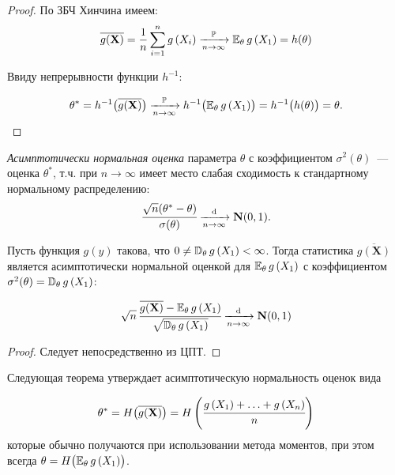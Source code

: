 \begin{proof}
    По ЗБЧ Хинчина имеем:
    \begin{equation*}
        \overline{g(\mathbf{X})} = 
        \frac{1}{n} \sum\limits_{i=1}^{n} g\left(X_{i}\right) 
        \xrightarrow[n \to \infty]{\mathbb{P}} \mathbb{E}_{\theta}\, g\left(X_{1}\right) = 
        h(\theta)
    \end{equation*}

    Ввиду непрерывности функции $h^{-1}$:

    \begin{equation*}
        \theta^{*} = h^{-1}\bigl(\overline{g(\mathbf{X})}\bigr) 
        \xrightarrow[n \to \infty]{\mathbb{P}} h^{-1}\bigl(\mathbb{E}_{\theta}\, g\left(X_{1}\right)\bigr) = 
        h^{-1}\bigl(h(\theta)\bigr) = \theta.
    \end{equation*}
\end{proof}

\begin{defn}
    \textit{Асимптотически нормальная оценка} параметра $\theta$ с коэффициентом $\sigma^{2}(\theta)$~--- оценка $\theta^{*}$, т.ч. при $n \rightarrow \infty$ имеет место слабая сходимость к стандартному нормальному распределению: 
    \begin{equation*}
        \cfrac{\sqrt{n}(\theta^{*}-\theta)}{\sigma(\theta)} \xrightarrow[n \to \infty]{\text{d}} \mathbf{N}(0, 1).
    \end{equation*}
\end{defn}

\begin{lem}
    Пусть функция $g(y)$ такова, что $0 \neq \mathbb{D}_{\theta}\, g\left(X_{1}\right)<\infty$. 
    Тогда статистика $\overline{g(\mathbf{X})}$ является асимптотически нормальной оценкой для $\mathbb{E}_{\theta}\, g\left(X_{1}\right)$ с коэффициентом $\sigma^{2}(\theta)=\mathbb{D}_{\theta}\, g\left(X_{1}\right)$:

    \begin{equation*}
        \sqrt{n} \, \cfrac{\overline{g(\mathbf{X})}-\mathbb{E}_{\theta}\, g\left(X_{1}\right)}{\sqrt{\mathbb{D}_{\theta}\, g\left(X_{1}\right)}} 
        \xrightarrow[n \to \infty]{\text{d}} \mathbf{N}(0, 1)
    \end{equation*}
\end{lem}

\begin{proof}
    Следует непосредственно из ЦПТ.
\end{proof}

\begin{rmrk}
    Следующая теорема утверждает асимптотическую нормальность оценок вида

    \begin{equation*}
        \theta^{*} = 
        H \bigl( \overline{g(\mathbf{X})} \bigr) = 
        H\left(\cfrac{g\left(X_{1}\right)+\ldots+g\left(X_{n}\right)}{n}\right)
    \end{equation*}
    которые обычно получаются при использовании метода моментов, при этом всегда $\theta = H \bigl(\mathbb{E}_{\theta}\, g\left(X_{1}\right) \bigr)$.
\end{rmrk}

